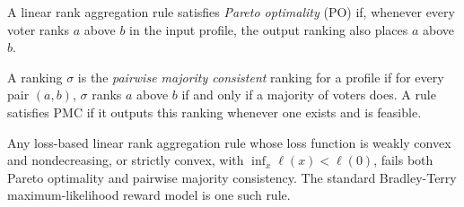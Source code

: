 \begin{definition}
\label{def:po_axiom}
A linear rank aggregation rule satisfies \emph{Pareto optimality} (PO) if, whenever every voter ranks $a$ above $b$ in the input profile, the output ranking also places $a$ above $b$.
\end{definition}

\begin{definition}
\label{def:pmc_axiom}
A ranking $\sigma$ is the \emph{pairwise majority consistent} ranking for a profile if for every pair $(a, b)$, $\sigma$ ranks $a$ above $b$ if and only if a majority of voters does. A rule satisfies PMC if it outputs this ranking whenever one exists and is feasible.
\end{definition}

\begin{theorem}
\label{thm:bt_mle_failure}
Any loss-based linear rank aggregation rule whose loss function is weakly convex and nondecreasing, or strictly convex, with $\inf_x \ell(x) < \ell(0)$, fails both Pareto optimality and pairwise majority consistency. The standard Bradley-Terry maximum-likelihood reward model is one such rule.
\end{theorem}

